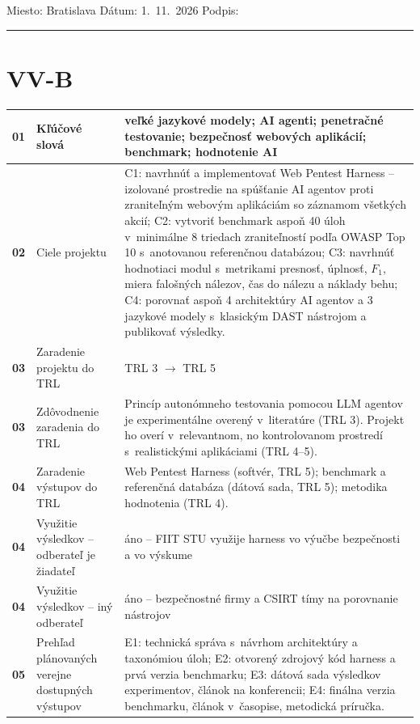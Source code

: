 \documentclass[10pt,a4paper]{article}
\newcommand{\polozka}[3]{\textbf{#1} & \cellcolor{formbg}\small #2 & #3 \\ \hline}
\newenvironment{formular}[2]{%
  \section*{#1 \quad {\normalsize #2}}
  \noindent\renewcommand{\arraystretch}{1.35}%
  \begin{longtable}{|p{0.6cm}|p{4.6cm}|p{10.3cm}|}\hline
}{%
  \end{longtable}
}
\begin{document}
\medskip\noindent Miesto: Bratislava \hfill Dátum: 1.~11.~2026 \hfill Podpis: \rule{4cm}{0.4pt}

\begin{formular}{VV-B}{Ciele, zámery a výstupy projektu}
\polozka{01}{Kľúčové slová}{veľké jazykové modely; AI agenti; penetračné testovanie; bezpečnosť webových aplikácií; benchmark; hodnotenie AI}
\polozka{02}{Ciele projektu}{%
C1: navrhnúť a implementovať Web Pentest Harness -- izolované prostredie na spúšťanie AI agentov proti zraniteľným webovým aplikáciám so záznamom všetkých akcií; \newline
C2: vytvoriť benchmark aspoň 40 úloh v~minimálne 8 triedach zraniteľností podľa OWASP Top 10 s~anotovanou referenčnou databázou; \newline
C3: navrhnúť hodnotiaci modul s~metrikami presnosť, úplnosť, $F_1$, miera falošných nálezov, čas do nálezu a náklady behu; \newline
C4: porovnať aspoň 4 architektúry AI agentov a 3 jazykové modely s~klasickým DAST nástrojom a publikovať výsledky.}
\polozka{03}{Zaradenie projektu do TRL}{TRL 3 $\rightarrow$ TRL 5}
\polozka{03}{Zdôvodnenie zaradenia do TRL}{Princíp autonómneho testovania pomocou LLM agentov je experimentálne overený v~literatúre (TRL 3). Projekt ho overí v~relevantnom, no kontrolovanom prostredí s~realistickými aplikáciami (TRL 4--5).}
\polozka{04}{Zaradenie výstupov do TRL}{Web Pentest Harness (softvér, TRL 5); benchmark a referenčná databáza (dátová sada, TRL 5); metodika hodnotenia (TRL 4).}
\polozka{04}{Využitie výsledkov -- odberateľ je žiadateľ}{áno -- FIIT STU využije harness vo výučbe bezpečnosti a vo výskume}
\polozka{04}{Využitie výsledkov -- iný odberateľ}{áno -- bezpečnostné firmy a CSIRT tímy na porovnanie nástrojov}
\polozka{05}{Prehľad plánovaných verejne dostupných výstupov}{%
E1: technická správa s~návrhom architektúry a taxonómiou úloh; \newline
E2: otvorený zdrojový kód harness a prvá verzia benchmarku; \newline
E3: dátová sada výsledkov experimentov, článok na konferencii; \newline
E4: finálna verzia benchmarku, článok v~časopise, metodická príručka.}
\end{formular}

\end{document}
